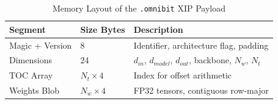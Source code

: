 \documentclass[conference]{IEEEtran}
\begin{document}
\begin{table}[h]
\centering
\caption{Memory Layout of the \texttt{.omnibit} XIP Payload}
\label{tab:omnibit_layout}
\begin{tabular}{|l|l|l|}
\hline
\textbf{Segment} & \textbf{Size Bytes} & \textbf{Description} \\ \hline
Magic + Version & 8 & Identifier, architecture flag, padding \\ \hline
Dimensions & 24 & $d_{in}$, $d_{model}$, $d_{out}$, backbone, $N_{w}$, $N_{t}$ \\ \hline
TOC Array & $N_{t} \times 4$ & Index for offset arithmetic \\ \hline
Weights Blob & $N_{w} \times 4$ & FP32 tensors, contiguous row-major \\ \hline
\end{tabular}
\end{table}
\end{document}
